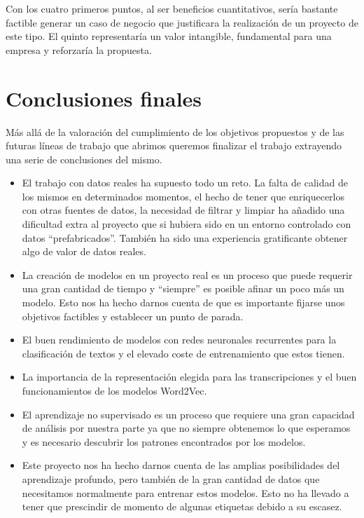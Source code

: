 Con los cuatro primeros puntos, al ser beneficios cuantitativos, sería bastante factible generar un caso de negocio que justificara la realización de un proyecto de este tipo. El quinto representaría un valor intangible, fundamental para una empresa y reforzaría la propuesta.



\section{Conclusiones finales}
\label{section:con:fin}

Más allá de la valoración del cumplimiento de los objetivos propuestos y de las futuras líneas de trabajo que abrimos queremos finalizar el trabajo extrayendo una serie de conclusiones del mismo. 


\begin{itemize}
\item El trabajo con datos reales ha supuesto todo un reto. La falta de calidad de los mismos en determinados momentos, el hecho de tener que enriquecerlos con otras fuentes de datos, la necesidad de filtrar y limpiar ha añadido una dificultad extra al proyecto que si hubiera sido en un entorno controlado con datos ``prefabricados''. También ha sido una experiencia gratificante obtener algo de valor de datos reales. 

\item La creación de modelos en un proyecto real es un proceso que puede requerir una gran cantidad de tiempo y ``siempre'' es posible afinar un poco más un modelo. Esto nos ha hecho darnos cuenta de que es importante fijarse unos objetivos factibles y establecer un punto de parada.

\item El buen rendimiento de modelos con redes neuronales recurrentes para la clasificación de textos y el elevado coste de entrenamiento que estos tienen. 

\item La importancia de la representación elegida para las transcripciones y el buen funcionamientos de los modelos Word2Vec.

\item El aprendizaje no supervisado es un proceso que requiere una gran capacidad de análisis por nuestra parte ya que no siempre obtenemos lo que esperamos y es necesario descubrir los patrones encontrados por los modelos.

\item Este proyecto nos ha hecho darnos cuenta de las amplias posibilidades del aprendizaje profundo, pero también de la gran cantidad de datos que necesitamos normalmente para entrenar estos modelos. Esto no ha llevado a tener que prescindir de momento de algunas etiquetas debido a su escasez.  


\end{itemize}

